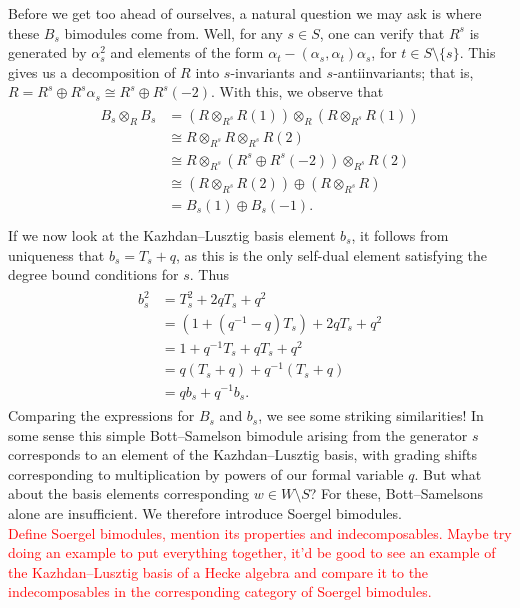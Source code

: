 \noindent Before we get too ahead of ourselves, a natural question we may ask is where these $B_s$ bimodules come from. Well, for any $s \in S$, one can verify that $R^s$ is generated by $\alpha_s^2$ and elements of the form $\alpha_t - (\alpha_s, \alpha_t)\alpha_s$, for $t \in S \setminus \{s\}$. This gives us a decomposition of $R$ into $s$-invariants and $s$-antiinvariants; that is, $R = R^s \oplus R^s \alpha_s \cong R^s \oplus R^s(-2)$. With this, we observe that
\begin{align*}
\begin{split}
B_s \otimes_R B_s &= (R \otimes_{R^s} R(1)) \otimes_R (R \otimes_{R^s} R(1))\\
&\cong R \otimes_{R^s} R \otimes_{R^s} R(2)\\
&\cong R \otimes_{R^s} (R^s \oplus R^s(-2)) \otimes_{R^s} R(2)\\
&\cong (R \otimes_{R^s} R(2)) \oplus (R \otimes_{R^s} R)\\
&= B_s(1) \oplus B_s(-1).\\
\end{split}
\end{align*}
\noindent If we now look at the Kazhdan--Lusztig basis element $b_s$, it follows from uniqueness that $b_s = T_s + q$, as this is the only self-dual element satisfying the degree bound conditions for $s$. Thus
\begin{align*}
\begin{split}
b_s^2 &= T_s^2 + 2qT_s + q^2\\
&= (1 + (q^{-1} - q)T_s) + 2qT_s + q^2\\
&= 1 + q^{-1}T_s + qT_s + q^2\\
&= q(T_s + q) + q^{-1}(T_s + q)\\
&= qb_s + q^{-1}b_s.
\end{split}
\end{align*}
\noindent Comparing the expressions for $B_s$ and $b_s$, we see some striking similarities! In some sense this simple Bott--Samelson bimodule arising from the generator $s$ corresponds to an element of the Kazhdan--Lusztig basis, with grading shifts corresponding to multiplication by powers of our formal variable $q$. But what about the basis elements corresponding $w \in W\setminus S$? For these, Bott--Samelsons alone are insufficient. We therefore introduce Soergel bimodules.\\

\noindent\textcolor{red}{Define Soergel bimodules, mention its properties and indecomposables. Maybe try doing an example to put everything together, it'd be good to see an example of the Kazhdan--Lusztig basis of a Hecke algebra and compare it to the indecomposables in the corresponding category of Soergel bimodules.}
\newpage

